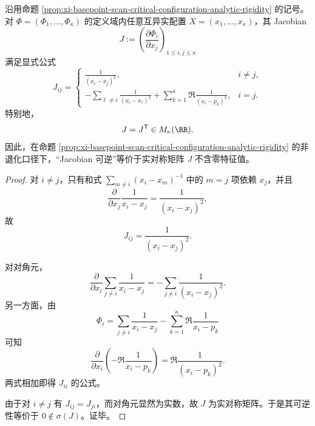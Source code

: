 \begin{theorem}\label{thm:xi-basepoint-scan-critical-jacobian-calogero-symmetric}
沿用命题 \ref{prop:xi-basepoint-scan-critical-configuration-analytic-rigidity} 的记号。对 \(\Phi=(\Phi_1,\dots,\Phi_\kappa)\) 的定义域内任意互异实配置 \(X=(x_1,\dots,x_\kappa)\)，其 Jacobian
\[
J:=\left(\frac{\partial\Phi_i}{\partial x_j}\right)_{1\le i,j\le \kappa}
\]
满足显式公式
\[
J_{ij}=
\begin{cases}
\displaystyle \frac{1}{(x_i-x_j)^2}, & i\neq j,\\[3mm]
\displaystyle -\sum_{\ell\neq i}\frac{1}{(x_i-x_\ell)^2}
+\sum_{k=1}^{\kappa}\Re\frac{1}{(x_i-p_k)^2}, & i=j.
\end{cases}
\]
特别地，
\[
J=J^{\mathsf T}\in M_\kappa(\RR).
\]
因此，在命题 \ref{prop:xi-basepoint-scan-critical-configuration-analytic-rigidity} 的非退化口径下，“Jacobian 可逆”等价于实对称矩阵 \(J\) 不含零特征值。
\end{theorem}
\begin{proof}
对 \(i\neq j\)，只有和式
\(
\sum_{m\neq i}(x_i-x_m)^{-1}
\)
中的 \(m=j\) 项依赖 \(x_j\)，并且
\[
\frac{\partial}{\partial x_j}\frac{1}{x_i-x_j}
=\frac{1}{(x_i-x_j)^2},
\]
故
\[
J_{ij}=\frac{1}{(x_i-x_j)^2}.
\]

对对角元，
\[
\frac{\partial}{\partial x_i}\sum_{j\neq i}\frac{1}{x_i-x_j}
=-\sum_{j\neq i}\frac{1}{(x_i-x_j)^2}.
\]
另一方面，由
\[
\Phi_i=
\sum_{j\neq i}\frac{1}{x_i-x_j}
-\sum_{k=1}^{\kappa}\Re\frac{1}{x_i-p_k}
\]
可知
\[
\frac{\partial}{\partial x_i}\left(-\Re\frac{1}{x_i-p_k}\right)
=\Re\frac{1}{(x_i-p_k)^2}.
\]
两式相加即得 \(J_{ii}\) 的公式。

由于对 \(i\neq j\) 有 \(J_{ij}=J_{ji}\)，而对角元显然为实数，故 \(J\) 为实对称矩阵。于是其可逆性等价于 \(0\notin\sigma(J)\)。证毕。
\end{proof}

